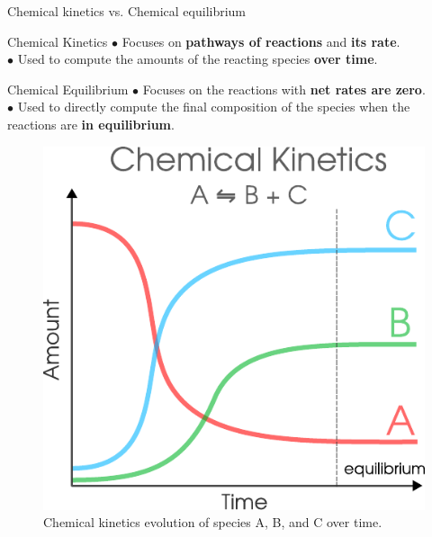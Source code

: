 \begin{frame}{Chemical kinetics vs. Chemical equilibrium}
%
\small
\lcol
\vskip 10pt
\begin{cbox}{Chemical Kinetics}
$\bullet$ Focuses on \alert{\textbf{pathways of reactions}} and  \alert{\textbf{its rate}}. \\
$\bullet$ Used to compute the amounts of the reacting species \alert{\textbf{over time}}. \\
\end{cbox}

\bigskip{}

\begin{cbox}{Chemical Equilibrium} 
$\bullet$ Focuses on the reactions with \alert{\textbf{net rates are zero}}. \\
$\bullet$ Used to directly compute the final composition of the species when
the reactions are \alert{\textbf{in equilibrium}}. 
\end{cbox}

\rcol

\vskip 10pt
\begin{figure}
\centering
\includegraphics[width=0.8\columnwidth]{figures/applications/chemical-kinetics-equilibrium-illustration-evolution-plot}
\caption*{Chemical kinetics evolution of species A, B, and C over time.}
\end{figure}

\ecol

\end{frame}


